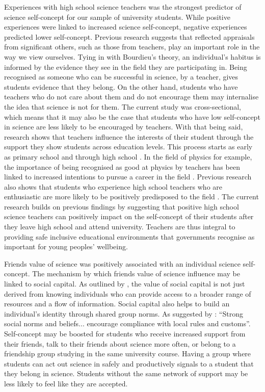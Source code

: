 Experiences with high school science teachers was the strongest predictor of science self-concept for our sample of university students. While positive experiences were linked to increased science self-concept, negative experiences predicted lower self-concept. Previous research suggests that reflected appraisals from significant others, such as those from teachers, play an important role in the way we view ourselves.\cite{bong2003academic} Tying in with Bourdieu's theory, an individual's habitus is informed by the evidence they see in the field they are participating in. Being recognised as someone who can be successful in science, by a teacher, gives students evidence that they belong. On the other hand, students who have teachers who do not care about them and do not encourage them may internalise the idea that science is not for them. The current study was cross-sectional, which means that it may also be the case that students who have low self-concept in science are less likely to be encouraged by teachers. With that being said, research shows that teachers influence the interests of their student through the support they show students across education levels.\cite{marjoribanks2006adolescents} This process starts as early as primary school \cite{fauth2014student} and through high school \cite{marjoribanks2006adolescents,Hazari2017}. In the field of physics for example, the importance of being recognised as good at physics by teachers has been linked to increased intentions to pursue a career in the field \cite{Hazari2017}. Previous research also shows that students who experience high school teachers who are enthusiastic are more likely to be positively predisposed to the field \cite{keller2017impact}. The current research builds on previous findings by suggesting that positive high school science teachers can positively impact on the self-concept of their students after they leave high school and attend university. Teachers are thus integral to providing safe inclusive educational environments that governments recognise as important for young peoples' wellbeing. \cite{wellbeing2019} 

Friends value of science was positively associated with an individual science self-concept. The mechanism by which friends value of science influence may be linked to social capital. As outlined by \cite{lin1999building}, the value of social capital is not just derived from knowing individuals who can provide access to a broader range of resources and a flow of information. Social capital also helps to build an individual's identity through shared group norms. As suggested by \cite[p.29]{Adler2017}: ``Strong social norms and beliefs... encourage compliance with local rules and customs''. Self-concept may be boosted for students who receive increased support from their friends, talk to their friends about science more often, or belong to a friendship group studying in the same university course. Having a group where students can act out science in safely and productively signals to a student that they belong in science. Students without the same network of support may be less likely to feel like they are accepted. 

